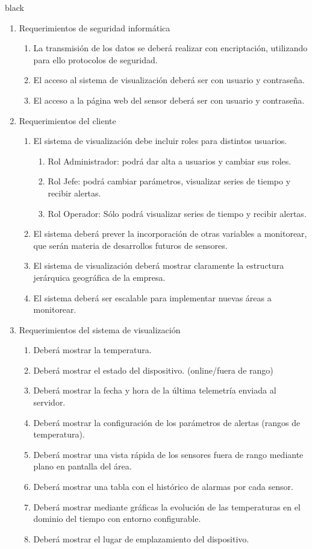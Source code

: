 \documentclass[11pt]{charter}
\begin{document}
\begin{consigna}{black}
\begin{enumerate}
\item Requerimientos de seguridad informática
	\begin{enumerate}
	\item La transmisión de los datos se deberá realizar con encriptación, utilizando para ello protocolos de seguridad.
	\item El acceso al sistema de visualización deberá ser con usuario y contraseña.
	\item El acceso a la página web del sensor deberá ser con usuario y contraseña.
	\end{enumerate}	

\item Requerimientos del cliente
	\begin{enumerate}
	\item El sistema de visualización debe incluir roles para distintos usuarios.
		\begin{enumerate}
		\item Rol Administrador: podrá dar alta a usuarios y cambiar sus roles.
	     \item Rol Jefe: podrá cambiar parámetros, visualizar series de tiempo y recibir alertas.
	     \item Rol Operador: Sólo podrá visualizar series de tiempo y recibir alertas.
	     \end{enumerate}
	\item El sistema deberá prever la incorporación de otras variables a monitorear, que serán materia de desarrollos futuros de sensores.
	\item El sistema de visualización deberá mostrar claramente la estructura jerárquica geográfica de la empresa.	
	\item El sistema deberá ser escalable para implementar nuevas áreas a monitorear.
		\end{enumerate}
		
\item Requerimientos del sistema de visualización
    \begin{enumerate}
	\item Deberá mostrar la temperatura.
	\item Deberá mostrar el estado del dispositivo. (online/fuera de rango)
	\item Deberá mostrar la fecha y hora de la última telemetría enviada al servidor.
	\item Deberá mostrar la configuración de los parámetros de alertas (rangos de temperatura).
	\item Deberá mostrar una vista rápida de los sensores fuera de rango mediante plano en pantalla del área.
	\item Deberá mostrar una tabla con el histórico de alarmas por cada sensor.
    \item Deberá mostrar mediante gráficas la evolución de las temperaturas en el dominio del tiempo con entorno configurable.
    \item Deberá mostrar el lugar de emplazamiento del dispositivo.
	\end{enumerate}	
    


\end{enumerate}
\end{consigna}
\end{document}
